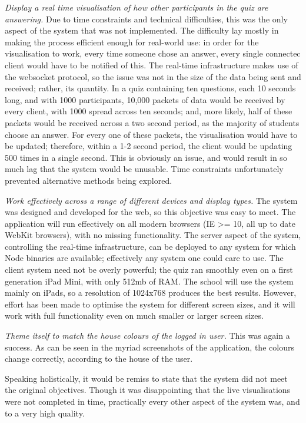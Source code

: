 \textit{Display a real time visualisation of how other participants in the quiz are answering.} Due to time constraints and technical difficulties, this was the only aspect of the system that was not implemented. The difficulty lay mostly in making the process efficient enough for real-world use: in order for the visualisation to work, every time someone chose an answer, every single connectec client would have to be notified of this. The real-time infrastructure makes use of the websocket protocol, so the issue was not in the size of the data being sent and received; rather, its quantity. In a quiz containing ten questions, each 10 seconds long, and with 1000 participants, 10,000 packets of data would be received by every client, with 1000 spread across ten seconds; and, more likely, half of these packets would be received across a two second period, as the majority of students choose an answer. For every one of these packets, the visualisation would have to be updated; therefore, within a 1-2 second period, the client would be updating 500 times in a single second. This is obviously an issue, and would result in so much lag that the system would be unusable. Time constraints unfortunately prevented alternative methods being explored.

\textit{Work effectively across a range of different devices and display types.} The system was designed and developed for the web, so this objective was easy to meet. The application will run effectively on all modern browsers (IE >= 10, all up to date WebKit browsers), with no missing functionality. The server aspect of the system, controlling the real-time infrastructure, can be deployed to any system for which Node binaries are available; effectively any system one could care to use. The client system need not be overly powerful; the quiz ran smoothly even on a first generation iPad Mini, with only 512mb of RAM. The school will use the system mainly on iPads, so a resolution of 1024x768 produces the best results. However, effort has been made to optimise the system for different screen sizes, and it will work with full functionality even on much smaller or larger screen sizes.

\textit{Theme itself to match the house colours of the logged in user.} This was again a success. As can be seen in the myriad screenshots of the application, the colours change correctly, according to the house of the user.

Speaking holistically, it would be remiss to state that the system did not meet the original objectives. Though it was disappointing that the live visualisations were not completed in time, practically every other aspect of the system was, and to a very high quality.
